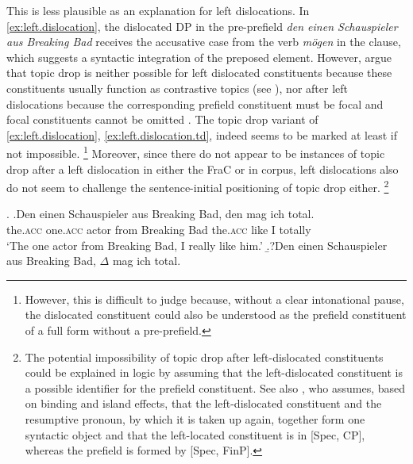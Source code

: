 This is less plausible as an explanation for left dislocations. 
In \ref{ex:left.dislocation}, the dislocated DP in the pre-prefield   \textit{den einen Schauspieler aus Breaking Bad} receives the accusative case from the verb \textit{mögen} in the clause, which suggests a syntactic integration of the preposed element.
However, \citet{volodina.onea2012} argue that topic drop is neither possible for left dislocated constituents because these constituents usually function as contrastive topics  (see ), nor after left dislocations because the corresponding prefield constituent must be focal and focal constituents cannot be omitted \citep[230--231]{volodina.onea2012}.
The topic drop variant of \ref{ex:left.dislocation}, \ref{ex:left.dislocation.td}, indeed seems to be marked at least if not impossible.%
\footnote{However, this is difficult to judge because, without a clear intonational pause, the dislocated constituent could also be understood as the prefield constituent of a full form without a pre-prefield.}
%
Moreover, since there do not appear to be instances of topic drop after a left dislocation in either the FraC or in  corpus,  left dislocations also do not seem to challenge the sentence-initial positioning of topic drop either.%
\footnote{The potential impossibility of topic drop after left-dislocated constituents could be explained in  logic by assuming that the left-dislocated constituent is a possible identifier for the prefield constituent.
See also \citet[165--166]{frey2005}, who assumes, based on binding  and island effects, that the left-dislocated  constituent and the resumptive pronoun, by which it is taken up again, together form one syntactic object and that the left-located constituent is in [Spec, CP], whereas the prefield is formed by [Spec, FinP].}

\ex.
\ag.\label{ex:left.dislocation}Den einen Schauspieler aus Breaking Bad, den mag ich total.\\
the.\textsc{acc} one.\textsc{acc} actor from Breaking Bad the.\textsc{acc} like I totally\\
`The one actor from Breaking Bad, I really like him.'
\b.?\label{ex:left.dislocation.td}Den einen Schauspieler aus Breaking Bad, $\Delta$ mag ich total.

